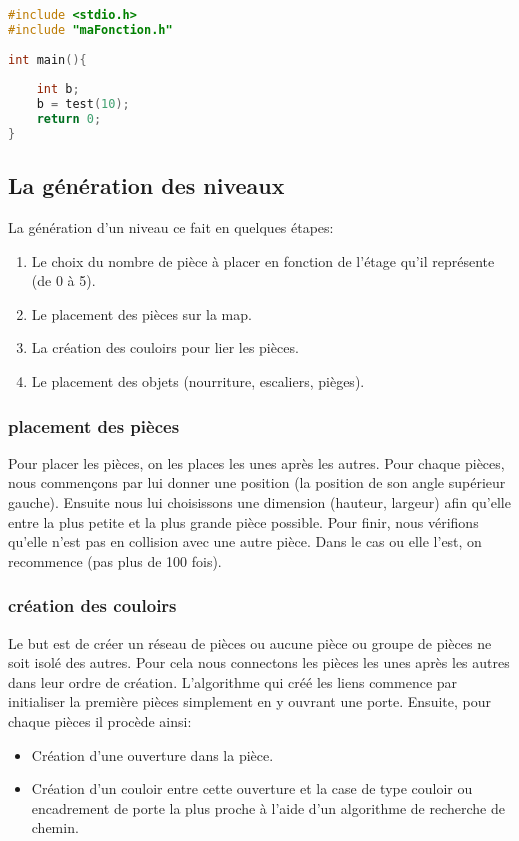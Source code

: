 \documentclass[11pt]{report}
\begin{document}
\begin{lstlisting}[caption=programme.c, language=C,style=Cstyle]
#include <stdio.h>
#include "maFonction.h"
	
int main(){
		
	int b;	
	b = test(10);
	return 0;
}
		\end{lstlisting}	
	
		\subsection{La génération des niveaux}
		
		La génération d'un niveau ce fait en quelques étapes:
		\begin{enumerate}
			\item Le choix du nombre de pièce à placer en fonction de l'étage qu'il représente (de 0 à 5).
			\item Le placement des pièces sur la map.
			\item La création des couloirs pour lier les pièces.
			\item Le placement des objets (nourriture, escaliers, pièges).
		\end{enumerate}
		
			\subsubsection{placement des pièces}
			
			Pour placer les pièces, on les places les unes après les autres. Pour chaque pièces, nous commençons par lui donner une position (la position de son angle supérieur gauche). Ensuite nous lui choisissons une dimension (hauteur, largeur) afin qu'elle entre la plus petite et la plus grande pièce possible.
			Pour finir, nous vérifions qu'elle n'est pas en collision avec une autre pièce.
			Dans le cas ou elle l'est, on recommence (pas plus de 100 fois).
			
			\subsubsection{création des couloirs}
			
			Le but est de créer un réseau de pièces ou aucune pièce ou groupe de pièces ne soit isolé des autres.
			Pour cela nous connectons les pièces les unes après les autres dans leur ordre de création.
			L'algorithme qui créé les liens commence par initialiser la première pièces simplement en y ouvrant une porte.
			Ensuite, pour chaque pièces il procède ainsi:
			\begin{itemize}
				\item Création d'une ouverture dans la pièce.
				\item Création d'un couloir entre cette ouverture et la case de type couloir ou encadrement de porte la plus proche à l'aide d'un algorithme de recherche de chemin.
			\end{itemize}
		
\end{document}
